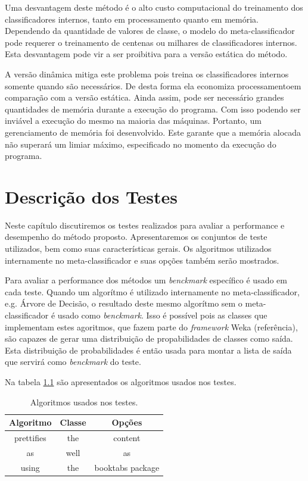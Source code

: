 \documentclass[dissertacao,brazil]{ThesisPUC}
\begin{document}
Uma desvantagem deste método é o alto custo computacional do treinamento dos classificadores internos, tanto em processamento quanto em memória. Dependendo da quantidade de valores de classe, o modelo do meta-classificador pode requerer o treinamento de centenas ou milhares de classificadores internos. Esta desvantagem pode vir a ser proibitiva para a versão estática do método. 

A versão dinâmica mitiga este problema pois treina os classificadores internos somente quando são necessários. De desta forma ela economiza processamentoem comparação com a versão estática. Ainda assim, pode ser necessário grandes quantidades de memória durante a execução do programa. Com isso podendo ser inviável a execução do mesmo na maioria das máquinas. Portanto, um gerenciamento de memória foi desenvolvido. Este garante que a memória alocada não superará um limiar máximo, especificado no momento da execução do programa.

\chapter{Descrição dos Testes}

Neste capítulo discutiremos os testes realizados para avaliar a performance e desempenho do método proposto.
Apresentaremos os conjuntos de teste utilizados, bem como suas características gerais. 
Os algoritmos utilizados internamente no meta-classificador e suas opções também serão mostrados.

Para avaliar a performance dos métodos um \textit{benckmark} específico é usado em cada teste.
Quando um algorítmo é utilizado internamente no meta-classificador, e.g. Árvore de Decisão, o resultado deste mesmo algorítmo sem o meta-classificador é usado como \textit{benckmark}.
Isso é possível pois as classes que implementam estes agoritmos, que fazem parte do \textit{framework} Weka (referência), são capazes de gerar uma distribuição de propabilidades de classes como saída.
Esta distribuição de probabilidades é então usada para montar a lista de saída que servirá como \textit{benckmark} do teste.


Na tabela \ref{tab:algoritmostestes} são apresentados os algoritmos usados nos testes.

\begin{table}[h!]
  \begin{center}
    \caption{Algoritmos usados nos testes.}
    \label{tab:algoritmostestes}
    \begin{tabular}{ccc}
      \toprule
      Algoritmo & Classe & Opções\\
      \midrule
      prettifies & the & content\\
      as & well & as\\
      using & the & booktabs package\\
      \bottomrule
    \end{tabular}
  \end{center}
\end{table}
\end{document}
